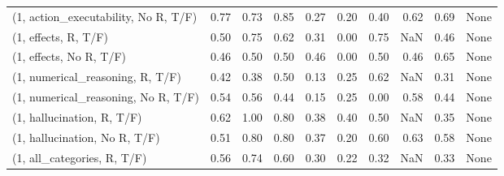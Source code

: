 \begin{table*}[h!]
\begin{adjustbox}{width=2\columnwidth,center}
\begin{tabular}{lrrr|rrr|rrr}
(1, action\_executability, No R, T/F) &                      0.77 &                  0.73 &                      0.85 &                          0.27 &                      0.20 &                          0.40 &                                   0.62 &                               0.69 &                                  None \\
(1, effects, R, T/F)                 &                      0.50 &                  0.75 &                      0.62 &                          0.31 &                      0.00 &                          0.75 &                                    NaN &                               0.46 &                                  None \\
(1, effects, No R, T/F)              &                      0.46 &                  0.50 &                      0.50 &                          0.46 &                      0.00 &                          0.50 &                                   0.46 &                               0.65 &                                  None \\
(1, numerical\_reasoning, R, T/F)     &                      0.42 &                  0.38 &                      0.50 &                          0.13 &                      0.25 &                          0.62 &                                    NaN &                               0.31 &                                  None \\
(1, numerical\_reasoning, No R, T/F)  &                      0.54 &                  0.56 &                      0.44 &                          0.15 &                      0.25 &                          0.00 &                                   0.58 &                               0.44 &                                  None \\
(1, hallucination, R, T/F)           &                      0.62 &                  1.00 &                      0.80 &                          0.38 &                      0.40 &                          0.50 &                                    NaN &                               0.35 &                                  None \\
(1, hallucination, No R, T/F)        &                      0.51 &                  0.80 &                      0.80 &                          0.37 &                      0.20 &                          0.60 &                                   0.63 &                               0.58 &                                  None \\
(1, all\_categories, R, T/F)          &                      0.56 &                  0.74 &                      0.60 &                          0.30 &                      0.22 &                          0.32 &                                    NaN &                               0.33 &                                  None \\

\end{tabular}
\end{adjustbox}
\end{table*}
